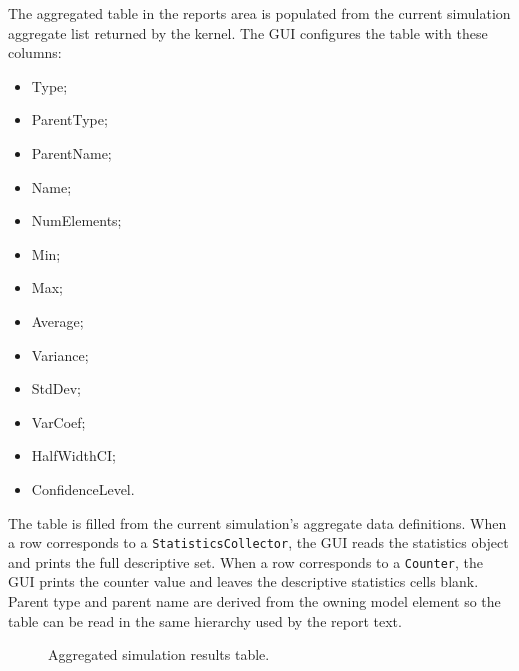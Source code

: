 The aggregated table in the reports area is populated from the current
simulation aggregate list returned by the kernel. The GUI configures the table
with these columns:
\begin{itemize}
\item Type;
\item ParentType;
\item ParentName;
\item Name;
\item NumElements;
\item Min;
\item Max;
\item Average;
\item Variance;
\item StdDev;
\item VarCoef;
\item HalfWidthCI;
\item ConfidenceLevel.
\end{itemize}

The table is filled from the current simulation's aggregate data definitions.
When a row corresponds to a \texttt{StatisticsCollector}, the GUI reads the
statistics object and prints the full descriptive set. When a row corresponds to
a \texttt{Counter}, the GUI prints the counter value and leaves the descriptive
statistics cells blank. Parent type and parent name are derived from the owning
model element so the table can be read in the same hierarchy used by the report
text.

\begin{figure}[htbp]
\centering
\caption{Aggregated simulation results table.}
\label{fig:results-table}
\end{figure}

